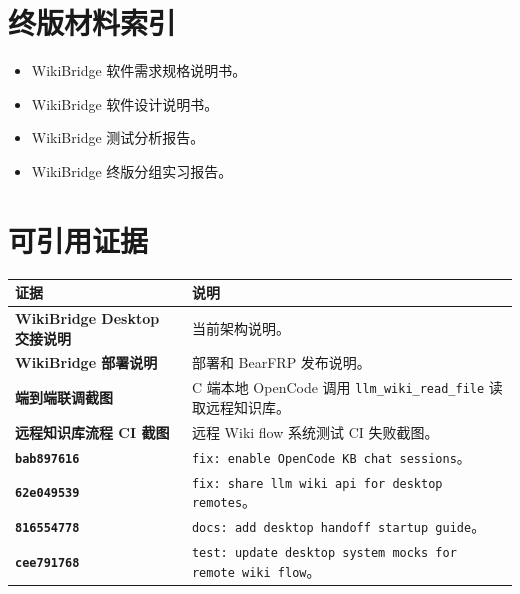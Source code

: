 \documentclass[UTF8,a4paper,12pt,fontset=fandol]{ctexart}
\newcommand{\code}[1]{\begingroup\urlstyle{tt}\footnotesize\nolinkurl{#1}\endgroup}
\begin{document}
\appendix
\section{终版材料索引}
\begin{itemize}
  \item WikiBridge 软件需求规格说明书。
  \item WikiBridge 软件设计说明书。
  \item WikiBridge 测试分析报告。
  \item WikiBridge 终版分组实习报告。
\end{itemize}

\section{可引用证据}
\begin{longtable}{>{\bfseries}p{3.2cm}p{11.0cm}}
\toprule
证据 & 说明 \\
\midrule
WikiBridge Desktop 交接说明 & 当前架构说明。 \\
WikiBridge 部署说明 & 部署和 BearFRP 发布说明。 \\
端到端联调截图 & C 端本地 OpenCode 调用 \code{llm_wiki_read_file} 读取远程知识库。 \\
远程知识库流程 CI 截图 & 远程 Wiki flow 系统测试 CI 失败截图。 \\
\code{bab897616} & \code{fix: enable OpenCode KB chat sessions}。 \\
\code{62e049539} & \code{fix: share llm wiki api for desktop remotes}。 \\
\code{816554778} & \code{docs: add desktop handoff startup guide}。 \\
\code{cee791768} & \code{test: update desktop system mocks for remote wiki flow}。 \\
\bottomrule
\end{longtable}
\end{document}
